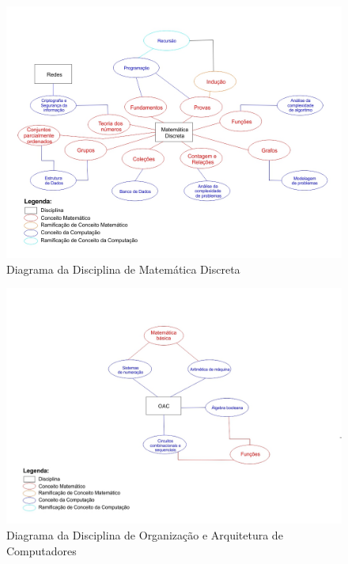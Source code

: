 \documentclass[12pt,a4paper]{article}
\begin{document}
\begin{figure}[!h]
	\centering
	\includegraphics[scale=0.4]{imagens/Diagrama Matematica Discreta.jpg} 
	\caption{Diagrama da Disciplina de Matemática Discreta}
\end{figure}

\begin{figure}[!h]
	\centering
	\includegraphics[scale=0.4]{imagens/Diagrama OAC.jpg} 
	\caption{Diagrama da Disciplina de Organização e Arquitetura de Computadores}
\end{figure}
\end{document}
